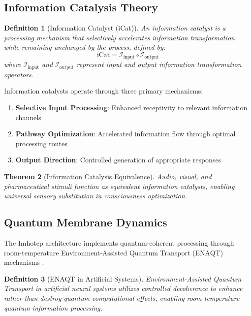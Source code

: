 \documentclass[12pt,a4paper]{article}
\newtheorem{theorem}{Theorem}[section]
\newtheorem{definition}[theorem]{Definition}
\theoremstyle{remark}
\begin{document}
\subsection{Information Catalysis Theory}

\begin{definition}[Information Catalyst (iCat)]
An information catalyst is a processing mechanism that selectively accelerates information transformation while remaining unchanged by the process, defined by:
\begin{equation}
\text{iCat} = \mathcal{I}_{\text{input}} \circ \mathcal{I}_{\text{output}}
\end{equation}
where $\mathcal{I}_{\text{input}}$ and $\mathcal{I}_{\text{output}}$ represent input and output information transformation operators.
\end{definition}

Information catalysts operate through three primary mechanisms:

\begin{enumerate}
\item \textbf{Selective Input Processing}: Enhanced receptivity to relevant information channels
\item \textbf{Pathway Optimization}: Accelerated information flow through optimal processing routes
\item \textbf{Output Direction}: Controlled generation of appropriate responses
\end{enumerate}

\begin{theorem}[Information Catalysis Equivalence]
Audio, visual, and pharmaceutical stimuli function as equivalent information catalysts, enabling universal sensory substitution in consciousness optimization.
\end{theorem}

\subsection{Quantum Membrane Dynamics}

The Imhotep architecture implements quantum-coherent processing through room-temperature Environment-Assisted Quantum Transport (ENAQT) mechanisms \cite{sachikonye2024membrane}.

\begin{definition}[ENAQT in Artificial Systems]
Environment-Assisted Quantum Transport in artificial neural systems utilizes controlled decoherence to enhance rather than destroy quantum computational effects, enabling room-temperature quantum information processing.
\end{definition}
\end{document}
